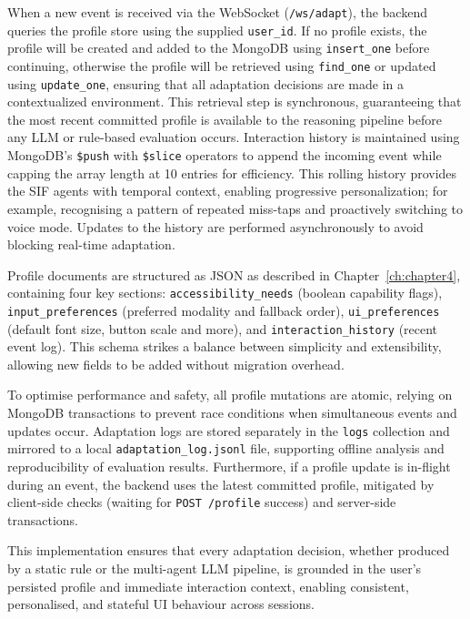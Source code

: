 \documentclass[openany]{book}
\begin{document}
When a new event is received via the WebSocket (\texttt{/ws/adapt}), the backend queries the profile store using the supplied \texttt{user\_id}. If no profile exists, the profile will be created and added to the MongoDB using \texttt{insert\_one} before continuing, otherwise the profile will be retrieved using \texttt{find\_one} or updated using \texttt{update\_one}, ensuring that all adaptation decisions are made in a contextualized environment. This retrieval step is synchronous, guaranteeing that the most recent committed profile is available to the reasoning pipeline before any LLM or rule-based evaluation occurs. Interaction history is maintained using MongoDB’s \texttt{\$push} with \texttt{\$slice} operators to append the incoming event while capping the array length at 10 entries for efficiency. This rolling history provides the SIF agents with temporal context, enabling progressive personalization; for example, recognising a pattern of repeated miss-taps and proactively switching to voice mode. Updates to the history are performed asynchronously to avoid blocking real-time adaptation.

Profile documents are structured as JSON as described in Chapter~\ref{ch:chapter4}, containing four key sections: \texttt{accessibility\_needs} (boolean capability flags), \texttt{input\_preferences} (preferred modality and fallback order), \texttt{ui\_preferences} (default font size, button scale and more), and \texttt{interaction\_history} (recent event log). This schema strikes a balance between simplicity and extensibility, allowing new fields to be added without migration overhead.

To optimise performance and safety, all profile mutations are atomic, relying on MongoDB transactions to prevent race conditions when simultaneous events and updates occur. Adaptation logs are stored separately in the \texttt{logs} collection and mirrored to a local \texttt{adaptation\_log.jsonl} file, supporting offline analysis and reproducibility of evaluation results. Furthermore, if a profile update is in-flight during an event, the backend uses the latest committed profile, mitigated by client-side checks (waiting for \texttt{POST /profile} success) and server-side transactions.

This implementation ensures that every adaptation decision, whether produced by a static rule or the multi-agent LLM pipeline, is grounded in the user’s persisted profile and immediate interaction context, enabling consistent, personalised, and stateful UI behaviour across sessions.
\end{document}

